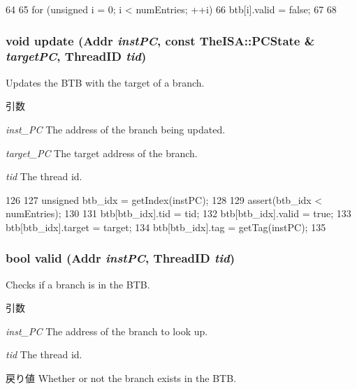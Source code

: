 \begin{DoxyCode}
64 {
65     for (unsigned i = 0; i < numEntries; ++i) {
66         btb[i].valid = false;
67     }
68 }
\end{DoxyCode}
\hypertarget{classDefaultBTB_a57a507feaef6242264a7fc6fa8e15bcd}{
\subsubsection[{update}]{\setlength{\rightskip}{0pt plus 5cm}void update ({\bf Addr} {\em instPC}, \/  const TheISA::PCState \& {\em targetPC}, \/  {\bf ThreadID} {\em tid})}}
\label{classDefaultBTB_a57a507feaef6242264a7fc6fa8e15bcd}
Updates the BTB with the target of a branch. 
\begin{DoxyParams}{引数}
\item[{\em inst\_\-PC}]The address of the branch being updated. \item[{\em target\_\-PC}]The target address of the branch. \item[{\em tid}]The thread id. \end{DoxyParams}



\begin{DoxyCode}
126 {
127     unsigned btb_idx = getIndex(instPC);
128 
129     assert(btb_idx < numEntries);
130 
131     btb[btb_idx].tid = tid;
132     btb[btb_idx].valid = true;
133     btb[btb_idx].target = target;
134     btb[btb_idx].tag = getTag(instPC);
135 }
\end{DoxyCode}
\hypertarget{classDefaultBTB_aadb1ec726de323616b1d961832dc48cd}{
\subsubsection[{valid}]{\setlength{\rightskip}{0pt plus 5cm}bool valid ({\bf Addr} {\em instPC}, \/  {\bf ThreadID} {\em tid})}}
\label{classDefaultBTB_aadb1ec726de323616b1d961832dc48cd}
Checks if a branch is in the BTB. 
\begin{DoxyParams}{引数}
\item[{\em inst\_\-PC}]The address of the branch to look up. \item[{\em tid}]The thread id. \end{DoxyParams}
\begin{DoxyReturn}{戻り値}
Whether or not the branch exists in the BTB. 
\end{DoxyReturn}



